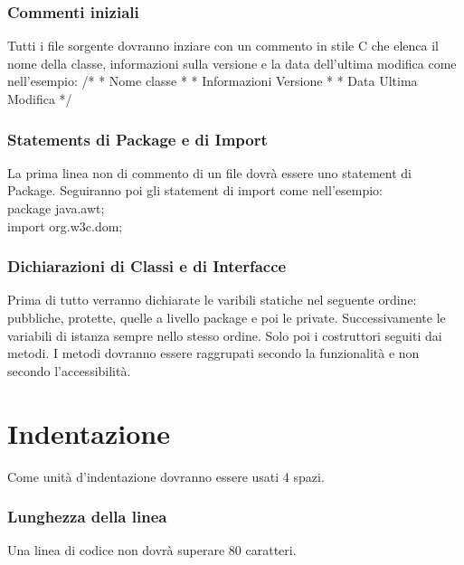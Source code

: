 \documentclass[11pt,titlepage,a4paper]{report}
\begin{document}
\subsection{Commenti iniziali}
Tutti i file sorgente dovranno inziare con un commento in stile C che elenca il nome della classe, informazioni sulla versione e la data dell'ultima modifica come nell'esempio: \newline
/* \newline
* Nome classe \newline
* \newline
* Informazioni Versione \newline
* \newline
* Data Ultima Modifica \newline
*/ \newline

\subsection{Statements di Package e di Import}
La prima linea non di commento di un file dovr\`a essere uno statement di Package. Seguiranno poi gli statement di import come nell'esempio: \\
package java.awt; \\ %
import org.w3c.dom; \\
\subsection{Dichiarazioni di Classi e di Interfacce}
Prima di tutto verranno dichiarate le varibili statiche nel seguente ordine: pubbliche, protette, quelle a livello package e poi le private. Successivamente le variabili di istanza sempre nello stesso ordine. Solo poi i costruttori seguiti dai metodi. I metodi dovranno essere raggrupati secondo la funzionalit\`a e non secondo l'accessibilit\`a.

\chapter{Indentazione}
Come unit\`a d'indentazione dovranno essere usati 4 spazi.
\subsection{Lunghezza della linea}
Una linea di codice non dovr\`a superare 80 caratteri.
\end{document}
